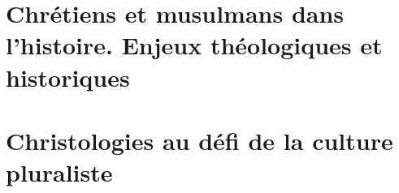 \documentclass[oneside,10pt]{book}
\begin{document}
 







\setcounter{page}{1}
 



%
%

% 
%
%
%

%
%
%
% 
%
%
%
%
%
%
%  
%  

%
%
%
%
%
%
%


 \part{Chrétiens et musulmans dans l'histoire. Enjeux théologiques et historiques}





\part{Christologies au défi de la culture pluraliste}




\end{document}
